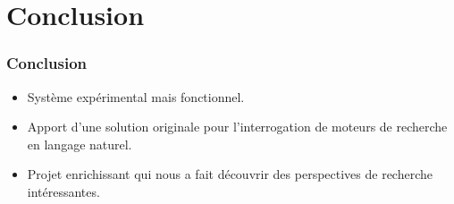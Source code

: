 \documentclass[xcolor=dvipsnames]{beamer}
\begin{document}
\section{Conclusion}
\frame
{
    \frametitle{Conclusion}
    \begin{itemize}
      \item<1-> Système expérimental mais fonctionnel.
      \item<2-> Apport d'une solution originale pour l'interrogation de moteurs de recherche en langage naturel.
      \item<3-> Projet enrichissant qui nous a fait découvrir des perspectives de recherche intéressantes.
    \end{itemize}
}
\end{document}
